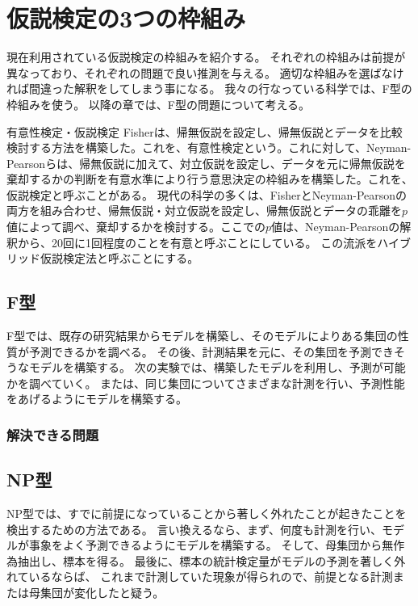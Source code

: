 
\chapter{仮説検定の3つの枠組み}
現在利用されている仮説検定の枠組みを紹介する。
それぞれの枠組みは前提が異なっており、それぞれの問題で良い推測を与える。
適切な枠組みを選ばなければ間違った解釈をしてしまう事になる。
我々の行なっている科学では、F型の枠組みを使う。
以降の章では、F型の問題について考える。



\begin{SMbox}{有意性検定・仮説検定}
    Fisherは、帰無仮説を設定し、帰無仮説とデータを比較検討する方法を構築した。これを、有意性検定という。これに対して、Neyman-Pearsonらは、帰無仮説に加えて、対立仮説を設定し、データを元に帰無仮説を棄却するかの判断を有意水準により行う意思決定の枠組みを構築した。これを、仮説検定と呼ぶことがある\cite{1573106361610039296}。
    現代の科学の多くは、FisherとNeyman-Pearsonの両方を組み合わせ、帰無仮説・対立仮説を設定し、帰無仮説とデータの乖離を$p$値によって調べ、棄却するかを検討する。ここでの$p$値は、Neyman-Pearsonの解釈から、20回に1回程度のことを有意と呼ぶことにしている。
    この流派をハイブリッド仮説検定法\cite{published_papers/18436201}と呼ぶことにする。
\end{SMbox}



\section{F型}
F型では、既存の研究結果からモデルを構築し、そのモデルによりある集団の性質が予測できるかを調べる。
その後、計測結果を元に、その集団を予測できそうなモデルを構築する。
次の実験では、構築したモデルを利用し、予測が可能かを調べていく。
または、同じ集団についてさまざまな計測を行い、予測性能をあげるようにモデルを構築する。

\subsection{解決できる問題} 




\section{NP型}
NP型では、すでに前提になっていることから著しく外れたことが起きたことを検出するための方法である。
言い換えるなら、まず、何度も計測を行い、モデルが事象をよく予測できるようにモデルを構築する。
そして、母集団から無作為抽出し、標本を得る。
最後に、標本の統計検定量がモデルの予測を著しく外れているならば、
これまで計測していた現象が得られので、前提となる計測または母集団が変化したと疑う。

